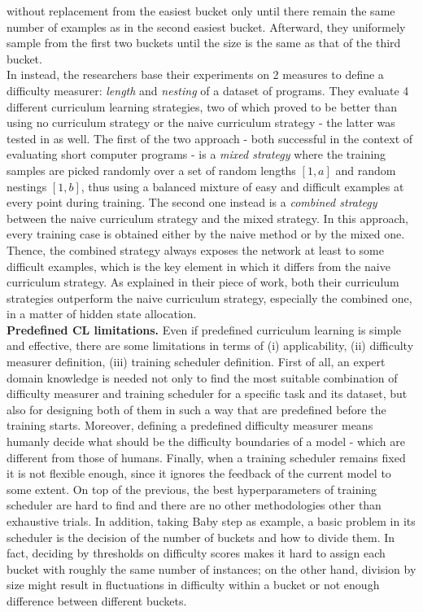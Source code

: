 without replacement from the easiest bucket only until there remain the same number of 
examples as in the second easiest bucket. Afterward, they uniformely sample 
from the first two buckets until the size is the same as that of the third bucket.\\
In \cite{zaremba2014learning} instead, the researchers base their experiments on 2 measures to 
define a difficulty measurer: \textit{length} and \textit{nesting} of a dataset of programs.
They evaluate 4 different curriculum learning strategies, two of which proved to be better than using no curriculum strategy or the 
naive curriculum strategy - the latter was tested in \cite{bengio2009curriculum} as well.
The first of the two approach - both successful in the context of evaluating 
short computer programs - is a \textit{mixed strategy} where the training samples
are picked randomly over a set of random lengths \([1, a]\) and random nestings \([1, b]\),
thus using a balanced mixture of easy and difficult examples at every point during training.
The second one instead is a \textit{combined strategy} between the naive curriculum strategy 
and the mixed strategy. In this approach, every training case is obtained 
either by the naive method or by the mixed one. 
Thence, the combined strategy always exposes the network at least to some difficult examples, which is the key element 
in which it differs from the naive curriculum strategy. As explained in their 
piece of work, both their curriculum strategies outperform the naive curriculum strategy, especially 
the combined one, in a matter of hidden state allocation.\\
\textbf{Predefined CL limitations.} Even if predefined curriculum learning is simple and effective, there are 
some limitations in terms of (i) applicability, (ii) difficulty measurer definition, (iii) training scheduler definition.
First of all, an expert domain knowledge is needed not only to find the most suitable
combination of difficulty measurer and training scheduler for a specific task and its dataset, 
but also for designing both of them in such a way that are predefined before the training starts.
Moreover, defining a predefined difficulty measurer means humanly decide what should be the difficulty boundaries of a model - which are
different from those of humans. Finally, when a training scheduler remains fixed 
it is not flexible enough, since it ignores the feedback of the current model to some extent.
On top of the previous, the best hyperparameters of training scheduler are hard to find and there are no 
other methodologies other than exhaustive trials. In addition, taking Baby step as example, 
a basic problem in its scheduler is the decision of the number of buckets and how to divide them. In fact, 
deciding by thresholds on difficulty scores makes it hard to assign each bucket with roughly the same number of instances; on 
the other hand, division by size might result in fluctuations in difficulty within a bucket or not enough difference between different 
buckets.\\

